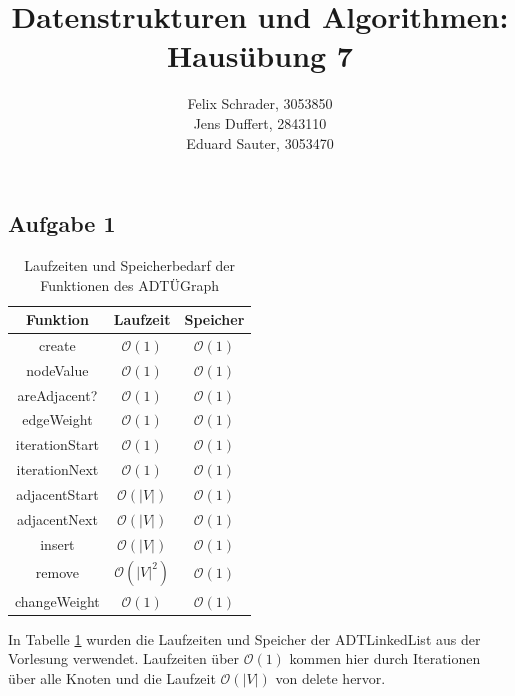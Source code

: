 \documentclass[11pt]{article}
\author{
  Felix Schrader, 3053850 \\ 
  Jens Duffert, 2843110 \\
  Eduard Sauter, 3053470
}
\title{Datenstrukturen und Algorithmen: Haus\"ubung 7}
\newcommand{\abs}[1]{\left| #1 \right| }
\begin{document}
\maketitle
\subsection*{Aufgabe 1}
  
  
  
  \begin{table}[h!]  
  \centering
  \begin{tabular}{|c|c|c|}
  \hline 
  Funktion & Laufzeit & Speicher \\ 
  \hline 
  create & $\mathcal{O}(1)$ & $\mathcal{O}(1)$ \\ 
  \hline 
  nodeValue & $\mathcal{O}(1)$ & $\mathcal{O}(1)$ \\ 
  \hline 
  areAdjacent? & $\mathcal{O}(1)$ & $\mathcal{O}(1)$ \\ 
  \hline 
  edgeWeight & $\mathcal{O}(1)$ & $\mathcal{O}(1)$ \\ 
  \hline 
  iterationStart & $\mathcal{O}(1)$ & $\mathcal{O}(1)$ \\ 
  \hline 
  iterationNext & $\mathcal{O}(1)$ & $\mathcal{O}(1)$ \\ 
  \hline 
  adjacentStart & $\mathcal{O}(\abs{V})$ & $\mathcal{O}(1)$ \\ 
  \hline 
  adjacentNext & $\mathcal{O}(\abs{V})$ & $\mathcal{O}(1)$ \\ 
  \hline 
  insert & $\mathcal{O}(\abs{V})$ & $\mathcal{O}(1)$ \\ 
  \hline 
  remove & $\mathcal{O}(\abs{V}^2)$ & $\mathcal{O}(1)$ \\ 
  \hline 
  changeWeight & $\mathcal{O}(1)$ & $\mathcal{O}(1)$ \\ 
  \hline 
  \end{tabular} 
  \caption{Laufzeiten und Speicherbedarf der Funktionen des ADTÜGraph}
  \label{tab:ADTUGraph}
  \end{table}
  
  In Tabelle \ref{tab:ADTUGraph} wurden die Laufzeiten und Speicher der
  ADTLinkedList aus der Vorlesung verwendet. Laufzeiten über $\mathcal{O}(1)$
  kommen hier durch Iterationen über alle Knoten und die Laufzeit
  $\mathcal{O}(\abs{V})$ von delete hervor.
  
\end{document}
